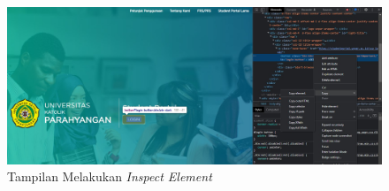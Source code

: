 \begin{figure}[H]
	\centering
	\includegraphics[scale=0.3]{Gambar/elemen.jpg}
	\caption{Tampilan Melakukan \textit{Inspect Element}} 
	\label{fig:inspect}
\end{figure}	